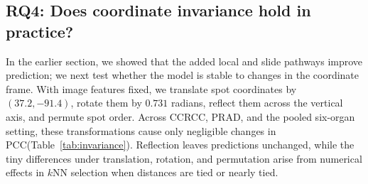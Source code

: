 \documentclass[11pt]{article}
\begin{document}
\subsection{RQ4: Does coordinate invariance hold in practice?}
\label{sec:coordinate_invariance}
\begin{table}[!ht]
\centering
\caption{\textbf{Coordinate-transform check on held-out slides.} PCC (mean $\pm$ std over three seeds, image features fixed); $\Delta$PCC relative to original coordinates. The pooled column uses a different gene panel.}
\label{tab:invariance}
\small
\setlength{\tabcolsep}{4pt}
\end{table}

In the earlier section, we showed that the added local and slide pathways improve prediction; we next test whether the model is stable to changes in the coordinate frame. With image features fixed, we translate spot coordinates by $(37.2,-91.4)$, rotate them by $0.731$ radians, reflect them across the vertical axis, and permute spot order. Across CCRCC, PRAD, and the pooled six-organ setting, these transformations cause only negligible changes in PCC(Table~\ref{tab:invariance}). Reflection leaves predictions unchanged, while the tiny differences under translation, rotation, and permutation arise from numerical effects in $k$NN selection when distances are tied or nearly tied.
\end{document}
